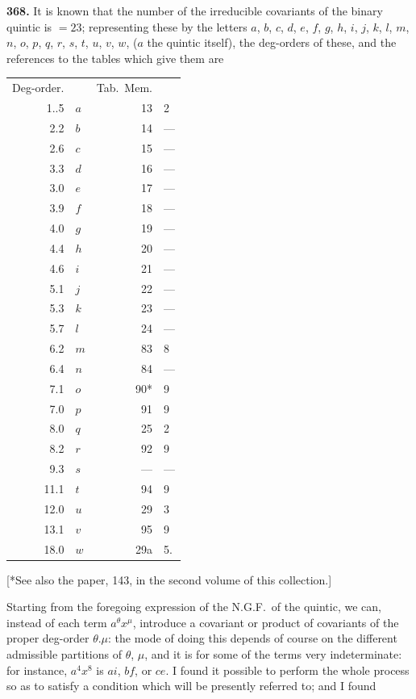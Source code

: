 \documentclass[12pt,a4paper]{article}
\begin{document}
\noindent\textbf{368.} It is known that the number of the irreducible covariants of the binary quintic is $=23$; representing these by the letters $a$, $b$, $c$, $d$, $e$, $f$, $g$, $h$, $i$, $j$, $k$, $l$, $m$, $n$, $o$, $p$, $q$, $r$, $s$, $t$, $u$, $v$, $w$, ($a$ the quintic itself), the deg-orders of these, and the references to the tables which give them are
\begin{center}
\begin{tabular}{r@{\quad}l@{\quad}r@{\quad}l}
Deg-order. & & Tab.\ Mem. & \\[2pt]
1..5 & $a$ & 13 & 2 \\
2.2 & $b$ & 14 & --- \\
2.6 & $c$ & 15 & --- \\
3.3 & $d$ & 16 & --- \\
3.0 & $e$ & 17 & --- \\
3.9 & $f$ & 18 & --- \\
4.0 & $g$ & 19 & --- \\
4.4 & $h$ & 20 & --- \\
4.6 & $i$ & 21 & --- \\
5.1 & $j$ & 22 & --- \\
5.3 & $k$ & 23 & --- \\
5.7 & $l$ & 24 & --- \\
6.2 & $m$ & 83 & 8 \\
6.4 & $n$ & 84 & --- \\
7.1 & $o$ & 90* & 9 \\
7.0 & $p$ & 91 & 9 \\
8.0 & $q$ & 25 & 2 \\
8.2 & $r$ & 92 & 9 \\
9.3 & $s$ & --- & --- \\
11.1 & $t$ & 94 & 9 \\
12.0 & $u$ & 29 & 3 \\
13.1 & $v$ & 95 & 9 \\
18.0 & $w$ & 29a & 5.
\end{tabular}
\end{center}
[*See also the paper, 143, in the second volume of this collection.]

Starting from the foregoing expression of the N.G.F.\ of the quintic, we can, instead of each term $a^\theta x^\mu$, introduce a covariant or product of covariants of the proper deg-order $\theta.\mu$: the mode of doing this depends of course on the different admissible partitions of $\theta$, $\mu$, and it is for some of the terms very indeterminate: for instance, $a^4 x^8$ is $ai$, $bf$, or $ce$. I found it possible to perform the whole process so as to satisfy a condition which will be presently referred to; and I found
\end{document}
